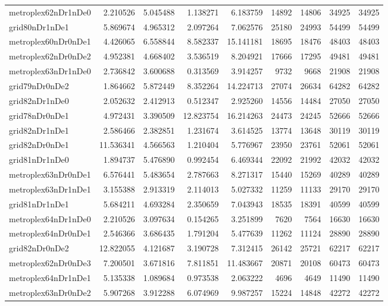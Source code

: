 \begin{longtable}{|l|r|r|r|r|r|r|r|r|}
metroplex62nDr1nDe0 & 2.210526 & 5.045488 & 1.138271 & 6.183759 & 14892 & 14806 & 34925 & 34925 \\
grid80nDr1nDe1 & 5.869674 & 4.965312 & 2.097264 & 7.062576 & 25180 & 24993 & 54499 & 54499 \\
metroplex60nDr0nDe1 & 4.426065 & 6.558844 & 8.582337 & 15.141181 & 18695 & 18476 & 48403 & 48403 \\
metroplex62nDr0nDe2 & 4.952381 & 4.668402 & 3.536519 & 8.204921 & 17666 & 17295 & 49481 & 49481 \\
metroplex63nDr1nDe0 & 2.736842 & 3.600688 & 0.313569 & 3.914257 & 9732 & 9668 & 21908 & 21908 \\
grid79nDr0nDe2 & 1.864662 & 5.872449 & 8.352264 & 14.224713 & 27074 & 26634 & 64282 & 64282 \\
grid82nDr1nDe0 & 2.052632 & 2.412913 & 0.512347 & 2.925260 & 14556 & 14484 & 27050 & 27050 \\
grid78nDr0nDe1 & 4.972431 & 3.390509 & 12.823754 & 16.214263 & 24473 & 24245 & 52666 & 52666 \\
grid82nDr1nDe1 & 2.586466 & 2.382851 & 1.231674 & 3.614525 & 13774 & 13648 & 30119 & 30119 \\
grid82nDr0nDe1 & 11.536341 & 4.566563 & 1.210404 & 5.776967 & 23950 & 23761 & 52061 & 52061 \\
grid81nDr1nDe0 & 1.894737 & 5.476890 & 0.992454 & 6.469344 & 22092 & 21992 & 42032 & 42032 \\
metroplex63nDr0nDe1 & 6.576441 & 5.483654 & 2.787663 & 8.271317 & 15440 & 15269 & 40289 & 40289 \\
metroplex63nDr1nDe1 & 3.155388 & 2.913319 & 2.114013 & 5.027332 & 11259 & 11133 & 29170 & 29170 \\
grid81nDr1nDe1 & 5.684211 & 4.693284 & 2.350659 & 7.043943 & 18535 & 18391 & 40599 & 40599 \\
metroplex64nDr1nDe0 & 2.210526 & 3.097634 & 0.154265 & 3.251899 & 7620 & 7564 & 16630 & 16630 \\
metroplex64nDr0nDe1 & 2.546366 & 3.686435 & 1.791204 & 5.477639 & 11262 & 11124 & 28890 & 28890 \\
grid82nDr0nDe2 & 12.822055 & 4.121687 & 3.190728 & 7.312415 & 26142 & 25721 & 62217 & 62217 \\
metroplex62nDr0nDe3 & 7.200501 & 3.671816 & 7.811851 & 11.483667 & 20871 & 20108 & 60473 & 60473 \\
metroplex64nDr1nDe1 & 5.135338 & 1.089684 & 0.973538 & 2.063222 & 4696 & 4649 & 11490 & 11490 \\
metroplex63nDr0nDe2 & 5.907268 & 3.912288 & 6.074969 & 9.987257 & 15224 & 14848 & 42272 & 42272 \\

\end{longtable}
